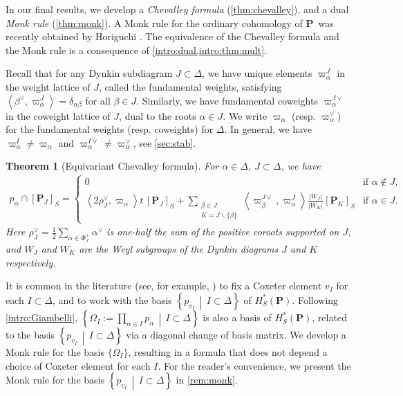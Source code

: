 \documentclass[10pt]{article}
\newtheorem{thm}{Theorem}
\numberwithin{thm}{section}
\theoremstyle{definition}
\theoremstyle{remark}
\newcommand{\Pet}{\ensuremath{\mathbf{P}}}
\newcommand{\set}[2]{\left\{#1\,\middle\vert\,#2\right\}}
\begin{document}
In our final results, we develop a \emph{Chevalley formula} (\cref{thm:chevalley}),
and a dual \emph{Monk rule} (\cref{thm:monk}).
A Monk rule for the ordinary cohomology of \Pet\ was recently obtained by Horiguchi \cite{horiguchi2021mixed}.
The equivalence of the Chevalley formula and the Monk rule is a consequence of \cref{intro:dual,intro:thm:mult}.

Recall that for any Dynkin subdiagram $J\subset\Delta$,
we have unique elements $\varpi_\alpha^J$ in the weight lattice of $J$,
called the fundamental weights,
satisfying $\left\langle\beta^\vee,\varpi_\alpha^J\right\rangle=\delta_{\alpha\beta}$ for all $\beta\in J$.
Similarly, we have fundamental coweights $\varpi_\alpha^{J\vee}$ in the coweight lattice of $J$,
dual to the roots $\alpha\in J$.
We write $\varpi_\alpha$ (resp. $\varpi_\alpha^\vee$) for the fundamental weights (resp. coweights) for $\Delta$.
In general, we have
$\varpi_\alpha^I\neq\varpi_\alpha$ and 
$\varpi^{I\vee}_\alpha\neq\varpi^\vee_\alpha$, see \cref{sec:stab}.

\begin{thm}[Equivariant Chevalley formula]
\label{intro:thm:chevalley}
For $\alpha\in\Delta$, $J\subset\Delta$, we have
\begin{align*}
p_\alpha\cap[\Pet_J]_S=
\begin{cases}
0 &\text{if }\alpha\not\in J,\\
\left\langle2\rho_J^\vee,\varpi_\alpha\right\rangle t\,[\Pet_J]_S+
\sum\limits_{\substack{\beta\in J\\ K=J\backslash\{\beta\}}}
\left\langle\varpi^{J\vee}_\beta,\varpi^J_\alpha\right\rangle
\frac{|W_J|}{|W_K|}[\Pet_K]_S
&\text{if }\alpha\in J.
\end{cases}
\end{align*}
Here $\rho_J^\vee=\frac 12\sum_{\alpha\in\Phi_J^+}\alpha^\vee$ is one-half the sum of the positive coroots supported on $J$,
and $W_J$ and $W_K$ are the Weyl subgroups of the Dynkin diagrams $J$ and $K$ respectively.
\end{thm}

It is common in the literature 
(see, for example, \cite{drellich:monk,insko.tymoczko:intersection.theory,goldin.gorbutt:PetSchubCalc})
to fix a Coxeter element $v_I$ for each $I\subset\Delta$,
and to work with the basis $\set{p_{v_I}}{I\subset\Delta}$ of $H^*_S(\Pet)$. %
Following \cref{intro:Giambelli}, $\set{\Omega_I:=\prod_{\alpha\in I}p_\alpha}{I\subset\Delta}$ is also a basis of $H_S^*(\Pet)$,
related to the basis $\set{p_{v_I}}{I\subset\Delta}$ via a diagonal change of basis matrix.
We develop a Monk rule for the basis $\{\Omega_I\}$, resulting in a formula that does not depend a choice of Coxeter element for each $I$. For the reader's convenience, we present the Monk rule for the basis $\set{p_{v_I}}{I\subset\Delta}$ in \cref{rem:monk}.
\end{document}
